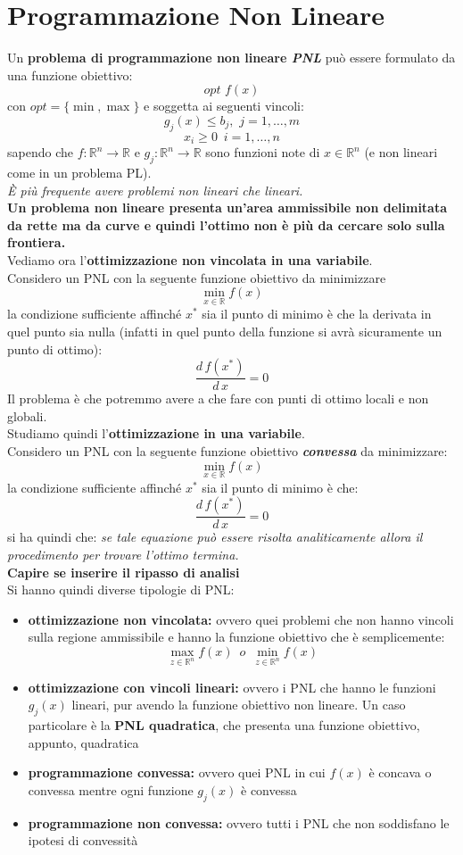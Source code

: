 \documentclass[a4paper,12pt, oneside]{book}
\begin{document}
\chapter{Programmazione Non Lineare}
Un \textbf{problema di programmazione non lineare \textit{PNL}} può
essere formulato da una funzione obiettivo:
\[opt\,\,f(x)\]
con $opt=\{\min,\max\}$ e soggetta ai seguenti vincoli:
\[g_j(x)\leq b_j,\,\,j=1,\ldots,m\]
\[x_i\geq 0\,\,\,i=1,\ldots,n\]
sapendo che $f:\mathbb{R}^n\to \mathbb{R}$ e $g_j:\mathbb{R}^n\to
\mathbb{R}$ sono funzioni note di $x\in \mathbb{R}^n$ (e non lineari
come in un problema PL).\\
\textit{È più frequente avere problemi non lineari che lineari.}\\
\textbf{Un problema non lineare presenta un'area ammissibile non
  delimitata da rette ma da curve e quindi l'ottimo non è più da
  cercare solo sulla frontiera.}
\\
Vediamo ora l'\textbf{ottimizzazione non vincolata in una
  variabile}.\\
Considero un PNL con la seguente funzione obiettivo da minimizzare
\[\min_{x\in\mathbb{R}}f(x)\]
la condizione sufficiente affinché $x^*$ sia il punto di minimo è che
la derivata in quel punto sia nulla (infatti in quel punto della
funzione si avrà sicuramente un punto di ottimo):
\[\frac{d\,f(x^*)}{d\,x}=0\]
Il problema è che potremmo avere a che fare con punti di ottimo locali
e non globali.\\
Studiamo quindi l'\textbf{ottimizzazione in una variabile}.\\
Considero un PNL con la seguente funzione obiettivo
\textbf{\textit{convessa}} da minimizzare:
\[\min_{x\in\mathbb{R}}f(x)\]
la condizione sufficiente affinché $x^*$ sia il punto di minimo è che:
\[\frac{d\,f(x^*)}{d\,x}=0\]
si ha quindi che:
\textit{se tale equazione può essere risolta analiticamente allora
  il procedimento per trovare l’ottimo termina.}\\
\textbf{Capire se inserire il ripasso di analisi}\\
Si hanno quindi diverse tipologie di PNL:
\begin{itemize}
  \item \textbf{ottimizzazione non vincolata:} ovvero quei problemi
  che non hanno vincoli sulla regione ammissibile e hanno la funzione
  obiettivo che è semplicemente:
  \[\max_{z\in\mathbb{R}^n}f(x)\,\,\,o\,\,\,\min_{z\in\mathbb{R}^n}f(x)\]
  \item \textbf{ottimizzazione con vincoli lineari:} ovvero i PNL che
  hanno le funzioni $g_j(x)$ lineari, pur avendo la funzione obiettivo
  non lineare. Un caso particolare è la \textbf{PNL quadratica}, che
  presenta una funzione obiettivo, appunto, quadratica
  \item \textbf{programmazione convessa:} ovvero quei PNL in cui
  $f(x)$ è concava o convessa mentre ogni funzione $g_j(x)$ è convessa
  \item \textbf{programmazione non convessa:} ovvero tutti i PNL che
  non soddisfano le ipotesi di convessità
\end{itemize}
\end{document}
